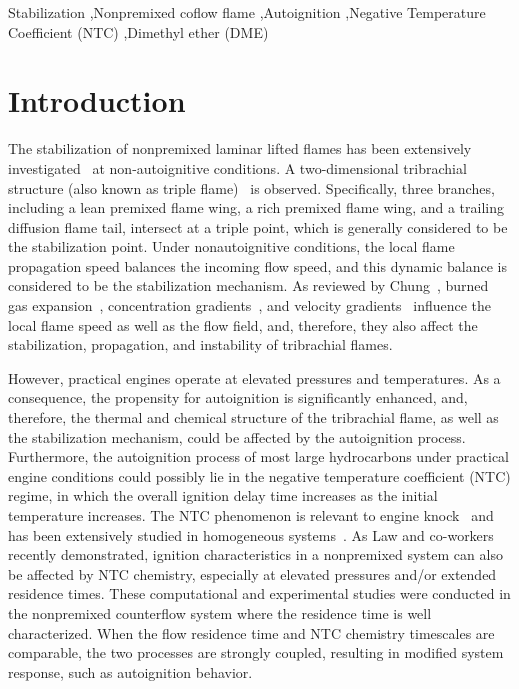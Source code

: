 \documentclass[review,3p,times]{elsarticle}
\begin{document}
\begin{frontmatter}
\begin{abstract}
\end{abstract}

\begin{keyword} 
Stabilization \sep Nonpremixed coflow flame \sep Autoignition \sep Negative Temperature Coefficient (NTC) \sep Dimethyl ether (DME) 
\end{keyword}

\end{frontmatter}



\section{Introduction}

The stabilization of nonpremixed laminar lifted flames has been extensively investigated~\cite{chung07} at non-autoignitive conditions. A two-dimensional tribrachial structure (also known as triple flame)~\cite{buckmaster02} is observed.  Specifically, three branches, including a lean premixed flame wing, a rich premixed flame wing, and a trailing diffusion flame tail, intersect at a triple point, which is generally considered to be the stabilization point.  Under nonautoignitive conditions, the local flame propagation speed balances the incoming flow speed, and this dynamic balance is considered to be the stabilization mechanism.  As reviewed by Chung~\cite{chung07}, burned gas expansion~\cite{ruetsch95,lee97,plessing98,kioni99}, concentration gradients~\cite{dold89,hartley91,ghosal00}, and velocity gradients~\cite{kim07} influence the local flame speed as well as the flow field, and, therefore, they also affect the stabilization, propagation, and instability of tribrachial flames.

However, practical engines operate at elevated pressures and temperatures.  As a consequence, the propensity for autoignition is significantly enhanced, and, therefore, the thermal and chemical structure of the tribrachial flame, as well as the stabilization mechanism, could be affected by the autoignition process.  Furthermore, the autoignition process of most large hydrocarbons under practical engine conditions could possibly lie in the negative temperature coefficient (NTC) regime, in which the overall ignition delay time increases as the initial temperature increases.  The NTC phenomenon is relevant to engine knock~\cite{battin-leclerc08} and has been extensively studied in homogeneous systems~\cite{zador11}.  As Law and co-workers~\cite{law12,zhao13,deng14} recently demonstrated, ignition characteristics in a nonpremixed system can also be affected by NTC chemistry, especially at elevated pressures and/or extended residence times.  These computational and experimental studies were conducted in the nonpremixed counterflow system where the residence time is well characterized.  When the flow residence time and NTC chemistry timescales are comparable, the two processes are strongly coupled, resulting in modified system response, such as autoignition behavior.
\end{document}
